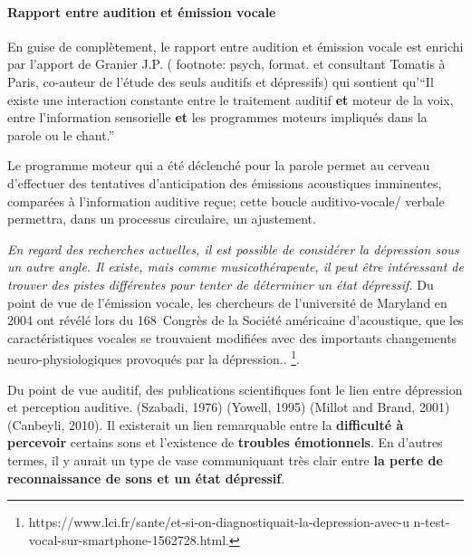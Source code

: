 \paragraph{Rapport entre audition et émission vocale}

En guise de complètement, le rapport entre audition et émission vocale
est enrichi par l'apport de Granier J.P. ( footnote: psych, format. et
consultant Tomatis à Paris, co-auteur de l'étude des seuls auditifs et
dépressifs) qui soutient qu'``Il existe une 
interaction
constante entre le traitement auditif \textbf{et} moteur de la
voix, entre l'information sensorielle \textbf{et} les programmes moteurs impliqués
dans la parole ou le chant.''

Le programme moteur qui a été déclenché
pour la parole permet au cerveau d'effectuer des tentatives d'anticipation
des émissions acoustiques imminentes, comparées à l'information
auditive reçue; cette boucle
auditivo-vocale/ verbale permettra, dans un processus circulaire, un ajustement.



  
\textit{En regard des recherches actuelles, il est possible de considérer la
dépression sous un autre angle. 
Il existe, mais comme musicothérapeute, il peut être intéressant de trouver
des pistes différentes pour tenter de
déterminer un état dépressif.}
Du point de vue de l'émission vocale,
les chercheurs de l'université de Maryland en 
2004 ont révélé lors du 168\ieme\ Congrès de la Société
américaine d'acoustique, que les caractéristiques 
vocales se trouvaient modifiées avec des importants changements
neuro-physiologiques provoqués par la
dépression.\autocite{le_service_metronews}.
\footnote{https://www.lci.fr/sante/et-si-on-diagnostiquait-la-depression-avec-u
n-test-vocal-sur-smartphone-1562728.html.}.

Du point de vue auditif, des publications scientifiques
font le lien entre dépression et perception auditive.
(Szabadi, 1976) (Yowell, 1995) (Millot and Brand, 2001)
(Canbeyli, 2010). Il existerait un lien remarquable  entre la \textbf{difficulté à percevoir} certains sons 
et l'existence 
de\textbf{ troubles émotionnels}.
En d'autres termes, il y
aurait un type de vase communiquant très clair entre\textbf{ la perte de reconnaissance de sons et
  un état dépressif}.

